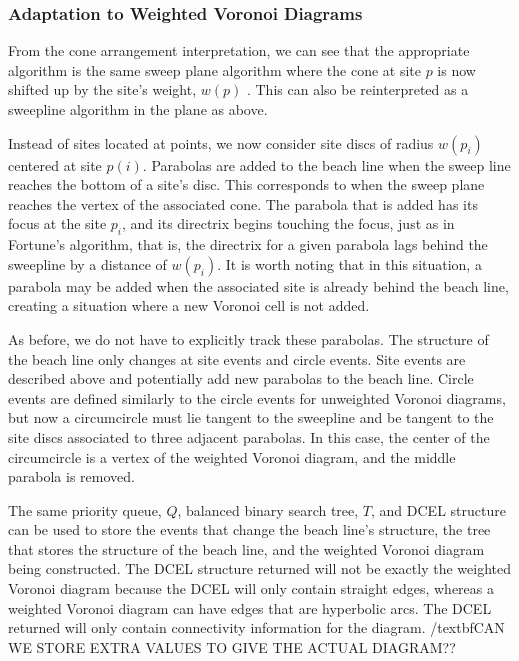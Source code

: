 \documentclass[a4paper, 11pt]{article}
\begin{document}
\subsubsection{Adaptation to Weighted Voronoi Diagrams}
From the cone arrangement interpretation, we can see that the appropriate algorithm is the same sweep plane algorithm where the cone at site $p$ is
now shifted up by the site's weight, $w(p)$ \cite{rosenberger_additive}. This can also be reinterpreted as a sweepline algorithm in the plane as
above.

Instead of sites located at points, we now consider site discs of radius $w(p_i)$ centered at site $p(i)$. Parabolas are added to the beach
line when the sweep line reaches the bottom of a site's disc. This corresponds to when the sweep plane reaches the vertex of the associated cone. The
parabola that is added has its focus at the site $p_i$, and its directrix begins touching the focus, just as in Fortune's algorithm, that is, the
directrix for a given parabola lags behind the sweepline by a distance of $w(p_i)$. It is worth noting that in this situation, a parabola may be added
when the associated site is already behind the beach line, creating a situation where a new Voronoi cell is not added.

As before, we do not have to explicitly track these parabolas. The structure of the beach line only changes at site events and circle events. Site
events are described above and potentially add new parabolas to the beach line. Circle events are defined similarly to the circle events for
unweighted Voronoi diagrams, but now a circumcircle must lie tangent to the sweepline and be tangent to the site discs associated to three adjacent
parabolas. In this case, the center of the circumcircle is a vertex of the weighted Voronoi diagram, and the middle parabola is removed.

The same priority queue, $Q$, balanced binary search tree, $T$, and DCEL structure can be used to store the events that change the beach line's
structure, the tree that stores the structure of the beach line, and the weighted Voronoi diagram being constructed. The DCEL structure returned will
not be exactly the weighted Voronoi diagram because the DCEL will only contain straight edges, whereas a weighted Voronoi diagram can have edges that
are hyperbolic arcs. The DCEL returned will only contain connectivity information for the diagram. /textbf{CAN WE STORE EXTRA VALUES TO GIVE THE
ACTUAL DIAGRAM??}

\printbibliography
\end{document}
